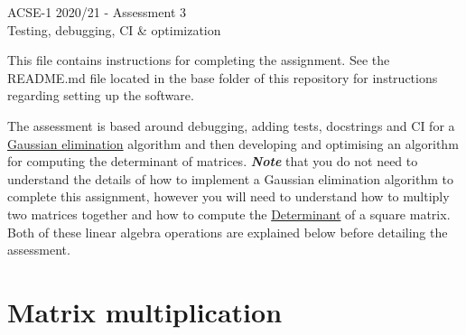 \documentclass[a4paper,11pt]{article}
\begin{document}
\begin{center}
\LARGE{ACSE-1 2020/21 - Assessment 3}\\
\vspace{0.5cm}
\LARGE{Testing, debugging, CI \& optimization}\\
\end{center}
\vspace{1.5cm}
%
This file contains instructions for completing the assignment. See the \newline
README.md file located in the base folder of this repository for instructions
regarding setting up the software.

The assessment is based around debugging, adding tests, docstrings and CI for a
\href{https://en.wikipedia.org/wiki/Gaussian\_elimination}{Gaussian elimination} algorithm
and then developing and optimising an algorithm for computing the determinant of matrices.
\textit{\textbf{Note}} that you do not need to understand the details of how to implement
a Gaussian elimination algorithm to complete this assignment, however you will need
to understand how to multiply two matrices together and how to compute the
\href{https://en.wikipedia.org/wiki/Determinant}{Determinant} of a square matrix.
Both of these linear algebra operations are explained below before detailing the
assessment.

\section*{Matrix multiplication}
\end{document}
